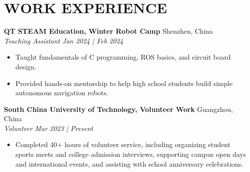 \documentclass[a4paper,9pt]{extarticle}
\begin{document}
\section*{{\textbf{\fontsize{14pt}{8pt}\selectfont W}\textbf{\scshape ORK EXPERIENCE}}}
\textbf{QT STEAM Education, Winter Robot Camp}  \hfill Shenzhen, China\\ %
\textit{Teaching Assistant \hfill Jan 2024 | Feb 2024} %
\begin{itemize}
    \item Taught fundamentals of C programming, ROS basics, and circuit board design.
    \item Provided hands-on mentorship to help high school students build simple autonomous navigation robots.
\end{itemize}
\textbf{South China University of Technology, Volunteer Work}  \hfill Guangzhou, China\\ %
\textit{Volunteer \hfill Mar 2023 | Present }%
\begin{itemize}
    \item  Completed 40+ hours of volunteer service, including organizing student sports meets and college admission interviews, supporting campus open days and international events, and assisting with school anniversary celebrations.
\end{itemize}

\end{document}
